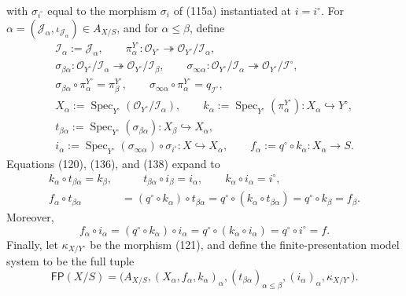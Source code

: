 \begin{definition}
\[  \]
  with $\sigma_{i^\circ}$ equal to the morphism $\sigma_i$ of (115a)
  instantiated at $i=i^\circ$.  For
  $\alpha=(\mathcal J_\alpha,\iota_{\mathcal J_\alpha})\in A_{X/S}$,
  and for $\alpha\leq\beta$, define
  \[
  \begin{gathered}
    \mathcal I_\alpha:=\mathcal J_\alpha,\qquad
    \pi_\alpha^{Y^\circ}\colon\mathcal O_{Y^\circ}
      \twoheadrightarrow\mathcal O_{Y^\circ}/\mathcal I_\alpha,\\
    \sigma_{\beta\alpha}\colon
      \mathcal O_{Y^\circ}/\mathcal I_\alpha
        \twoheadrightarrow\mathcal O_{Y^\circ}/\mathcal I_\beta,
    \qquad
    \sigma_{\infty\alpha}\colon
      \mathcal O_{Y^\circ}/\mathcal I_\alpha
        \twoheadrightarrow\mathcal O_{Y^\circ}/\mathcal I^\circ,\\
    \sigma_{\beta\alpha}\circ\pi_\alpha^{Y^\circ}
      =\pi_\beta^{Y^\circ},
    \qquad
    \sigma_{\infty\alpha}\circ\pi_\alpha^{Y^\circ}
      =q_{\mathcal I^\circ},\\
    X_\alpha:=\operatorname{Spec}_{Y^\circ}
      (\mathcal O_{Y^\circ}/\mathcal I_\alpha),\qquad
    k_\alpha:=\operatorname{Spec}_{Y^\circ}(\pi_\alpha^{Y^\circ})
      \colon X_\alpha\hookrightarrow Y^\circ,\\
    t_{\beta\alpha}:=\operatorname{Spec}_{Y^\circ}
      (\sigma_{\beta\alpha})\colon X_\beta\hookrightarrow X_\alpha,\\
    i_\alpha:=\operatorname{Spec}_{Y^\circ}
      (\sigma_{\infty\alpha})\circ\sigma_{i^\circ}
      \colon X\hookrightarrow X_\alpha,\qquad
    f_\alpha:=q^\circ\circ k_\alpha\colon X_\alpha\to S.
  \end{gathered}                                                  \tag{138}
  \]
  Equations (120), (136), and (138) expand to
  \[
  \begin{aligned}
    k_\alpha\circ t_{\beta\alpha}=k_\beta,
    &\qquad
    t_{\beta\alpha}\circ i_\beta=i_\alpha,
    \qquad
    k_\alpha\circ i_\alpha=i^\circ,\\
    f_\alpha\circ t_{\beta\alpha}
      &=(q^\circ\circ k_\alpha)\circ t_{\beta\alpha}
       =q^\circ\circ(k_\alpha\circ t_{\beta\alpha})
       =q^\circ\circ k_\beta=f_\beta.
  \end{aligned}                                                 \tag{139}
  \]
  Moreover,
  \[
    f_\alpha\circ i_\alpha
      =(q^\circ\circ k_\alpha)\circ i_\alpha
      =q^\circ\circ(k_\alpha\circ i_\alpha)
      =q^\circ\circ i^\circ=f.                                \tag{140}
  \]
  Finally, let $\kappa_{X/Y^\circ}$ be the morphism (121), and define the
  finite-presentation model system to be the full tuple
  \[
    \mathsf{FP}(X/S)
      =\bigl(A_{X/S},(X_\alpha,f_\alpha,k_\alpha)_\alpha,
        (t_{\beta\alpha})_{\alpha\leq\beta},(i_\alpha)_\alpha,
        \kappa_{X/Y^\circ}\bigr).                               \tag{141}
  \]
\end{definition}

